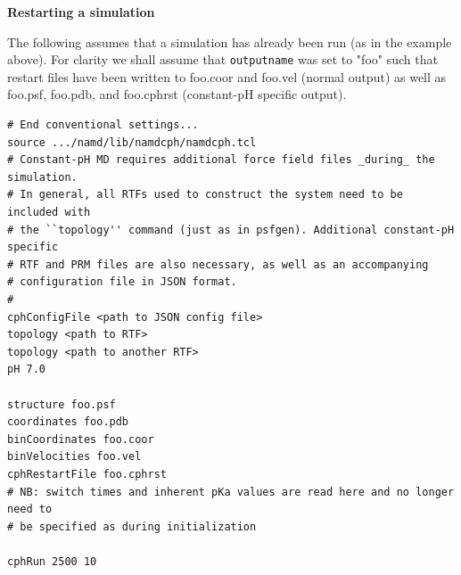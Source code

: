 \newpage
\noindent
\textbf{Restarting a simulation}

\noindent
The following assumes that a simulation has already been run (as in the example
  above).
For clarity we shall assume that \texttt{outputname} was set to "foo" such that
  restart files have been written to foo.coor and foo.vel (normal output) as
  well as foo.psf, foo.pdb, and foo.cphrst (constant-pH specific output).

\begin{verbatim}
# End conventional settings...
source .../namd/lib/namdcph/namdcph.tcl
# Constant-pH MD requires additional force field files _during_ the simulation.
# In general, all RTFs used to construct the system need to be included with
# the ``topology'' command (just as in psfgen). Additional constant-pH specific
# RTF and PRM files are also necessary, as well as an accompanying
# configuration file in JSON format.
#
cphConfigFile <path to JSON config file>
topology <path to RTF>
topology <path to another RTF>
pH 7.0

structure foo.psf
coordinates foo.pdb
binCoordinates foo.coor
binVelocities foo.vel
cphRestartFile foo.cphrst
# NB: switch times and inherent pKa values are read here and no longer need to
# be specified as during initialization

cphRun 2500 10
\end{verbatim}

%

